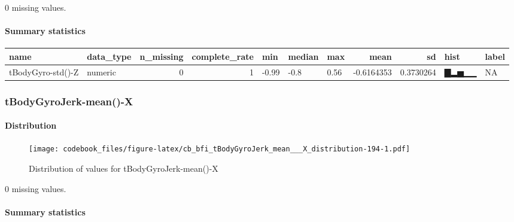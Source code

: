 \documentclass[
]{article}
\begin{document}
0 missing values.

\hypertarget{tBodyGyro_std___Z_summary}{%
\paragraph{Summary statistics}\label{tBodyGyro_std___Z_summary}}

\begin{longtable}[]{@{}llrrlllrrll@{}}
\toprule
name & data\_type & n\_missing & complete\_rate & min & median & max &
mean & sd & hist & label \\
\midrule
\endhead
tBodyGyro-std()-Z & numeric & 0 & 1 & -0.99 & -0.8 & 0.56 & -0.6164353 &
0.3730264 & ▇▂▅▁▁ & NA \\
\bottomrule
\end{longtable}

\hypertarget{tBodyGyroJerk_mean___X}{%
\subsubsection{tBodyGyroJerk-mean()-X}\label{tBodyGyroJerk_mean___X}}

\hypertarget{tBodyGyroJerk_mean___X_distribution}{%
\paragraph{Distribution}\label{tBodyGyroJerk_mean___X_distribution}}

\begin{figure}
\centering
\texttt{[image: codebook\_files/figure-latex/cb\_bfi\_tBodyGyroJerk\_mean\_\_\_X\_distribution-194-1.pdf]}
\caption{Distribution of values for tBodyGyroJerk-mean()-X}
\end{figure}

0 missing values.

\hypertarget{tBodyGyroJerk_mean___X_summary}{%
\paragraph{Summary statistics}\label{tBodyGyroJerk_mean___X_summary}}
\end{document}
